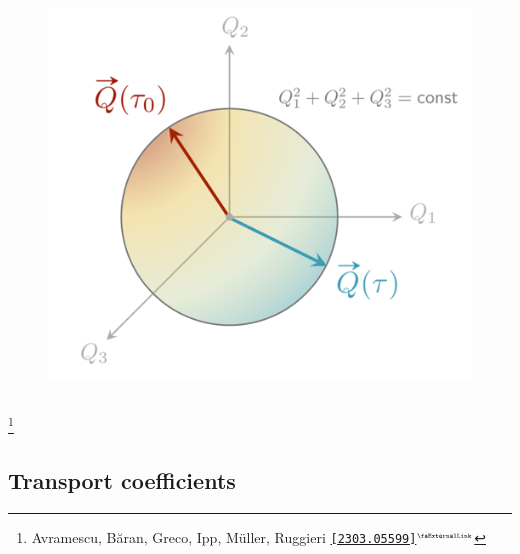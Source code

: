 \documentclass[aspectratio=169,11pt,usenames,dvipsnames]{beamer}
\renewcommand{\thefootnote}{\color{customblue}\faPaperPlaneO}
\newcommand\blfootnote[1]{%
  \begingroup
  \renewcommand\thefootnote{}\footnote{#1}%
  \addtocounter{footnote}{-1}%
  \endgroup
}
\begin{document}
\begin{frame}[noframenumbering]
\begin{columns}[onlytextwidth,t]
\begin{figure}[!hbt]
                \includegraphics[width=1.05\columnwidth]{images/wong_charge.png}
            \end{figure}
    \end{columns}

    \blfootnote{\scriptsize Avramescu, Băran, Greco, Ipp, Müller, Ruggieri  \href{https://arxiv.org/abs/2303.05599}{{\color{palgold}\texttt{[2303.05599]}$^\text{\tiny\faExternalLink}$}}}
\end{frame}


\subsection{Transport coefficients}

\end{document}

